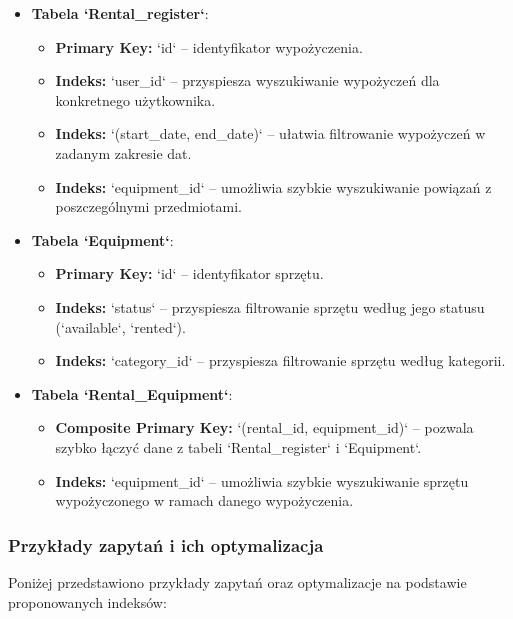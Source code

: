 \documentclass{article}
\begin{document}
\begin{itemize}
    \item \textbf{Tabela `Rental\_register`}: 
    \begin{itemize}
        \item \textbf{Primary Key:} `id` – identyfikator wypożyczenia.
        \item \textbf{Indeks:} `user\_id` – przyspiesza wyszukiwanie wypożyczeń dla konkretnego użytkownika.
        \item \textbf{Indeks:} `(start\_date, end\_date)` – ułatwia filtrowanie wypożyczeń w zadanym zakresie dat.
        \item \textbf{Indeks:} `equipment\_id` – umożliwia szybkie wyszukiwanie powiązań z poszczególnymi przedmiotami.
    \end{itemize}
    
    \item \textbf{Tabela `Equipment`}: 
    \begin{itemize}
        \item \textbf{Primary Key:} `id` – identyfikator sprzętu.
        \item \textbf{Indeks:} `status` – przyspiesza filtrowanie sprzętu według jego statusu (`available`, `rented`).
        \item \textbf{Indeks:} `category\_id` – przyspiesza filtrowanie sprzętu według kategorii.
    \end{itemize}
    
    \item \textbf{Tabela `Rental\_Equipment`}: 
    \begin{itemize}
        \item \textbf{Composite Primary Key:} `(rental\_id, equipment\_id)` – pozwala szybko łączyć dane z tabeli `Rental\_register` i `Equipment`.
        \item \textbf{Indeks:} `equipment\_id` – umożliwia szybkie wyszukiwanie sprzętu wypożyczonego w ramach danego wypożyczenia.
    \end{itemize}
\end{itemize}

\subsubsection{\textbf {Przykłady zapytań i ich optymalizacja}}

Poniżej przedstawiono przykłady zapytań oraz optymalizacje na podstawie proponowanych indeksów:
\end{document}
